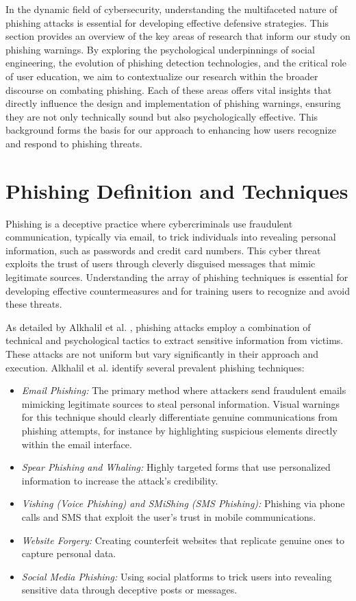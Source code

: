 \documentclass[
  a4paper,  %
  twoside,  %
  bibliography=totoc,
  headsepline,
  cleardoublepage=empty,
  parskip=half,
  draft=false
]{scrbook}
\begin{document}
In the dynamic field of cybersecurity, understanding the multifaceted nature of phishing attacks is essential for developing effective defensive strategies. This section provides an overview of the key areas of research that inform our study on phishing warnings. By exploring the psychological underpinnings of social engineering, the evolution of phishing detection technologies, and the critical role of user education, we aim to contextualize our research within the broader discourse on combating phishing. Each of these areas offers vital insights that directly influence the design and implementation of phishing warnings, ensuring they are not only technically sound but also psychologically effective. This background forms the basis for our approach to enhancing how users recognize and respond to phishing threats.

\section{Phishing Definition and Techniques}
Phishing is a deceptive practice where cybercriminals use fraudulent communication, typically via email, to trick individuals into revealing personal information, such as passwords and credit card numbers. This cyber threat exploits the trust of users through cleverly disguised messages that mimic legitimate sources. Understanding the array of phishing techniques is essential for developing effective countermeasures and for training users to recognize and avoid these threats.

As detailed by Alkhalil et al. \cite{alkhalil}, phishing attacks employ a combination of technical and psychological tactics to extract sensitive information from victims. These attacks are not uniform but vary significantly in their approach and execution.
Alkhalil et al. identify several prevalent phishing techniques:
\begin{itemize}
    \item \textit{Email Phishing:} The primary method where attackers send fraudulent emails mimicking legitimate sources to steal personal information. Visual warnings for this technique should clearly differentiate genuine communications from phishing attempts, for instance by highlighting suspicious elements directly within the email interface.
    \item \textit{Spear Phishing and Whaling:} Highly targeted forms that use personalized information to increase the attack's credibility.
    \item \textit{Vishing (Voice Phishing) and SMiShing (SMS Phishing):} Phishing via phone calls and SMS that exploit the user's trust in mobile communications.
    \item \textit{Website Forgery:} Creating counterfeit websites that replicate genuine ones to capture personal data.
    \item \textit{Social Media Phishing:} Using social platforms to trick users into revealing sensitive data through deceptive posts or messages.
\end{itemize}
\end{document}
